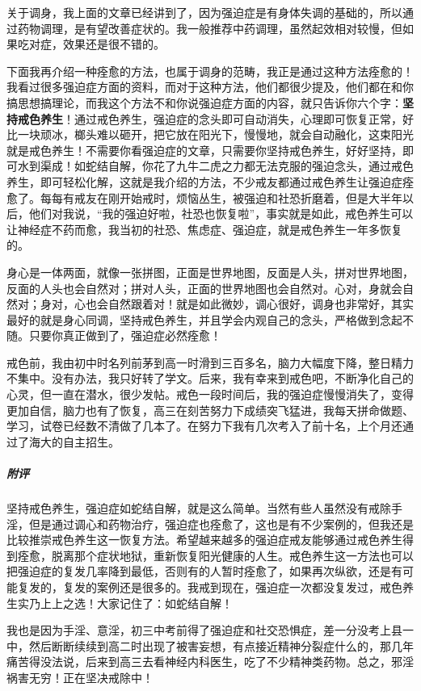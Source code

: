 关于调身，我上面的文章已经讲到了，因为强迫症是有身体失调的基础的，所以通过药物调理，是有望改善症状的。我一般推荐中药调理，虽然起效相对较慢，但如果吃对症，效果还是很不错的。

下面我再介绍一种痊愈的方法，也属于调身的范畴，我正是通过这种方法痊愈的！我看过很多强迫症方面的资料，而对于这种方法，他们都很少提及，他们都在和你搞思想搞理论，而我这个方法不和你说强迫症方面的内容，就只告诉你六个字：\textbf{坚持戒色养生}！通过戒色养生，强迫症的念头即可自动消失，心理即可恢复正常，好比一块顽冰，榔头难以砸开，把它放在阳光下，慢慢地，就会自动融化，这束阳光就是戒色养生！不需要你看强迫症的文章，只需要你坚持戒色养生，好好坚持，即可水到渠成！如蛇结自解，你花了九牛二虎之力都无法克服的强迫念头，通过戒色养生，即可轻松化解，这就是我介绍的方法，不少戒友都通过戒色养生让强迫症痊愈了。每每有戒友在刚开始戒时，烦恼丛生，被强迫和社恐折磨着，但是大半年以后，他们对我说，“我的强迫好啦，社恐也恢复啦”，事实就是如此，戒色养生可以让神经症不药而愈，我当初的社恐、焦虑症、强迫症，就是戒色养生一年多恢复的。

身心是一体两面，就像一张拼图，正面是世界地图，反面是人头，拼对世界地图，反面的人头也会自然对；拼对人头，正面的世界地图也会自然对。心对，身就会自然对；身对，心也会自然跟着对！就是如此微妙，调心很好，调身也非常好，其实最好的就是身心同调，坚持戒色养生，并且学会内观自己的念头，严格做到念起不随。只要你真正做到了，强迫症必然痊愈！

\begin{case}[强迫症]
    戒色前，我由初中时名列前茅到高一时滑到三百多名，脑力大幅度下降，整日精力不集中。没有办法，我只好转了学文。后来，我有幸来到戒色吧，不断净化自己的心灵，但一直在潜水，很少发帖。戒色一段时间后，我的强迫症慢慢消失了，变得更加自信，脑力也有了恢复，高三在刻苦努力下成绩突飞猛进，我每天拼命做题、学习，试卷已经数不清做了几本了。在努力下我有几次考入了前十名，上个月还通过了海大的自主招生。
    \subparagraph{附评} 坚持戒色养生，强迫症如蛇结自解，就是这么简单。当然有些人虽然没有戒除手淫，但是通过调心和药物治疗，强迫症也痊愈了，这也是有不少案例的，但我还是比较推崇戒色养生这一恢复方法。希望越来越多的强迫症戒友能够通过戒色养生得到痊愈，脱离那个症状地狱，重新恢复阳光健康的人生。戒色养生这一方法也可以把强迫症的复发几率降到最低，否则有的人暂时痊愈了，如果再次纵欲，还是有可能复发的，复发的案例还是很多的。我戒到现在，强迫症一次都没复发过，戒色养生实乃上上之选！大家记住了：如蛇结自解！
\end{case}

\begin{case}[强迫症]
    我也是因为手淫、意淫，初三中考前得了强迫症和社交恐惧症，差一分没考上县一中，然后断断续续到高二时出现了被害妄想，有点接近精神分裂症什么的，那几年痛苦得没法说，后来到高三去看神经内科医生，吃了不少精神类药物。总之，邪淫祸害无穷！正在坚决戒除中！
\end{case}

